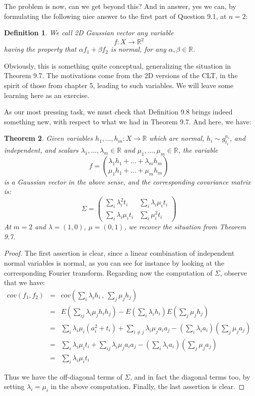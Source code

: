 \documentclass[12pt]{amsbook}
\newtheorem{theorem}{Theorem}[chapter]
\newtheorem{definition}[theorem]{Definition}
\begin{document}
The problem is now, can we get beyond this? And in answer, yes we can, by formulating the following nice answer to the first part of Question 9.1, at $n=2$:


\begin{definition}
We call 2D Gaussian vector any variable 
$$f:X\to\mathbb R^2$$
having the property that $\alpha f_1+\beta f_2$ is normal, for any $\alpha,\beta\in\mathbb R$.
\end{definition}

Obviously, this is something quite conceptual, generalizing the situation in Theorem 9.7. The motivations come from the 2D versions of the CLT, in the spirit of those from chapter 5, leading to such variables. We will leave some learning here as an exercise.

\bigskip

As our most pressing task, we must check that Definition 9.8 brings indeed something new, with respect to what we had in Theorem 9.7. And here, we have:

\begin{theorem}
Given variables $h_1,\ldots,h_m:X\to\mathbb R$ which are normal, $h_i\sim g_{t_i}^{a_i}$, and independent, and scalars $\lambda_1,\ldots,\lambda_m\in\mathbb R$ and $\mu_1,\ldots,\mu_m\in\mathbb R$, the variable
$$f=\binom{\lambda_1h_1+\ldots+\lambda_mh_m}{\mu_1h_1+\ldots+\mu_mh_m}$$
is a Gaussian vector in the above sense, and the corresponding covariance matrix is:
$$\Sigma=\begin{pmatrix}
\sum_i\lambda_i^2t_i&\sum_i\lambda_i\mu_it_i\\
\sum_i\lambda_i\mu_it_i&\sum_i\mu_i^2t_i\end{pmatrix}$$
At $m=2$ and $\lambda=(1,0)$, $\mu=(0,1)$, we recover the situation from Theorem 9.7.
\end{theorem}

\begin{proof}
The first assertion is clear, since a linear combination of independent normal variables is normal, as you can see for instance by looking at the corresponding Fourier transform. Regarding now the computation of $\Sigma$, observe that we have: 
\begin{eqnarray*}
cov(f_1,f_2)
&=&cov\left(\sum_i\lambda_ih_i\,,\ \sum_j\mu_jh_j\right)\\
&=&E\left(\sum_{ij}\lambda_i\mu_jh_ih_j\right)-E\left(\sum_i\lambda_ih_i\right)E\left(\sum_j\mu_jh_j\right)\\
&=&\sum_i\lambda_i\mu_i(a_i^2+t_i)+\sum_{i\neq j}\lambda_i\mu_ja_ia_j-\left(\sum_i\lambda_ia_i\right)\left(\sum_j\mu_ja_j\right)\\
&=&\sum_i\lambda_i\mu_it_i+\sum_{ij}\lambda_i\mu_ja_ia_j-\left(\sum_i\lambda_ia_i\right)\left(\sum_j\mu_ja_j\right)\\
&=&\sum_i\lambda_i\mu_it_i
\end{eqnarray*}

Thus we have the off-diagonal terms of $\Sigma$, and in fact the diagonal terms too, by setting $\lambda_i=\mu_i$ in the above computation. Finally, the last assertion is clear.
\end{proof}
\end{document}
